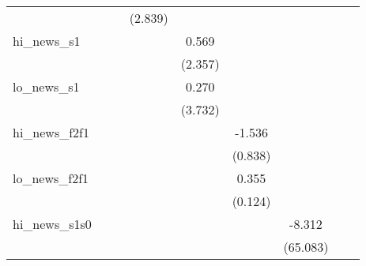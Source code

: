 {\begin{tabular}{l*{8}{c}}
            &                     &                     &     (2.839)         &                     &                     &                     &                     &                     \\
\addlinespace
hi\_news\_s1  &                     &                     &                     &       0.569         &                     &                     &                     &                     \\
            &                     &                     &                     &     (2.357)         &                     &                     &                     &                     \\
\addlinespace
lo\_news\_s1  &                     &                     &                     &       0.270         &                     &                     &                     &                     \\
            &                     &                     &                     &     (3.732)         &                     &                     &                     &                     \\
\addlinespace
hi\_news\_f2f1&                     &                     &                     &                     &      -1.536\sym{*}  &                     &                     &                     \\
            &                     &                     &                     &                     &     (0.838)         &                     &                     &                     \\
\addlinespace
lo\_news\_f2f1&                     &                     &                     &                     &       0.355\sym{***}&                     &                     &                     \\
            &                     &                     &                     &                     &     (0.124)         &                     &                     &                     \\
\addlinespace
hi\_news\_s1s0&                     &                     &                     &                     &                     &      -8.312         &                     &                     \\
            &                     &                     &                     &                     &                     &    (65.083)         &                     &                     \\

\end{tabular}}
